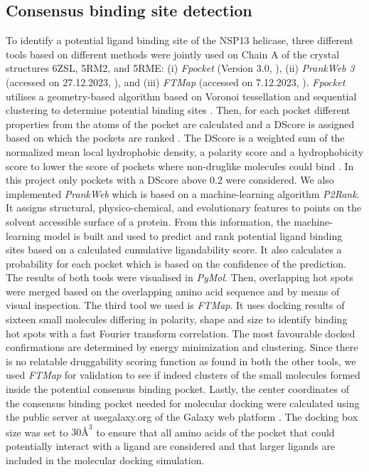 \documentclass[11pt, letterpaper, titlepage]{article}
\renewcommand{\cite}{\parencite}
\begin{document}
\subsection{Consensus binding site detection}
To identify a potential ligand binding site of the NSP13 helicase, three different tools based on different methods were jointly used on Chain A of the crystal structures 6ZSL, 5RM2, and 5RME: (i) \textit{Fpocket} (Version 3.0, \textcite{package_Fpocket}), (ii) \textit{PrankWeb 3} (accessed on 27.12.2023, \textcite{package_P2Rank, package_PrankWeb, package_PrankWeb3}), and (iii) \textit{FTMap} (accessed on 7.12.2023, \textcite{package_FTMAP}).  
\textit{Fpocket} utilises a geometry-based algorithm based on Voronoi tessellation and sequential clustering to determine potential binding sites \cite{package_Fpocket}. Then, for each pocket different properties from the atoms of the pocket are calculated and a \ac{DScore} is assigned based on which the pockets are ranked \cite{package_Fpocket}. 
The \ac{DScore} is a weighted sum of the normalized mean local hydrophobic density, a polarity score %
and a hydrophobicity score to lower the score of pockets where non-druglike molecules could bind \cite{Ricci_2022}. In this project only pockets with a \ac{DScore} above 0.2 were considered. 
We also implemented \textit{PrankWeb} \cite{package_P2Rank, package_PrankWeb, package_PrankWeb3} which is based on a machine-learning algorithm \textit{P2Rank}. It assigns structural, physico-chemical, and evolutionary features to points on the solvent accessible surface of a protein. From this information, the machine-learning model is built and used to predict and rank potential ligand binding sites based on a calculated cumulative ligandability score. It also calculates a probability for each pocket which is based on the confidence of the prediction.
The results of both tools were visualised in \textit{PyMol}. Then, overlapping hot spots were merged based on the overlapping amino acid sequence and by means of visual inspection.
The third tool we used is \textit{FTMap}. It uses docking results of sixteen small molecules differing in polarity, shape and size to identify binding hot spots with a fast Fourier transform correlation. The most favourable docked confirmations are determined by energy minimization and clustering. Since there is no relatable druggability scoring function as found in both the other tools, we used \textit{FTMap} for validation to see if indeed clusters of the small molecules formed inside the potential consensus binding pocket.
Lastly, the center coordinates of the consensus binding pocket needed for molecular docking were calculated using the public server at usegalaxy.org of the Galaxy web platform \cite{galaxy}. The docking box size was set to $30 \si{\angstrom}^3$ to ensure that all amino acids of the pocket that could potentially interact with a ligand are considered and that larger ligands are included in the molecular docking simulation.
\end{document}
